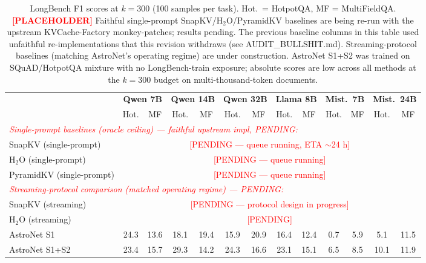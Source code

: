 \begin{table}[t]
\caption{LongBench F1 scores at $k{=}300$ (100 samples per task). Hot.\ = HotpotQA, MF = MultiFieldQA. \textcolor{red}{\textbf{[PLACEHOLDER]}} Faithful single-prompt SnapKV/H$_2$O/PyramidKV baselines are being re-run with the upstream KVCache-Factory monkey-patches; results pending. The previous baseline columns in this table used unfaithful re-implementations that this revision withdraws (see AUDIT\_BULLSHIT.md). Streaming-protocol baselines (matching AstroNet's operating regime) are under construction. AstroNet S1+S2 was trained on SQuAD/HotpotQA mixture with no LongBench-train exposure; absolute scores are low across all methods at the $k{=}300$ budget on multi-thousand-token documents.}
\label{tab:longbench}
\centering
\small
\setlength{\tabcolsep}{2.5pt}
\begin{tabular}{l cc cc cc cc cc cc}
\toprule
& \multicolumn{2}{c}{\textbf{Qwen 7B}} & \multicolumn{2}{c}{\textbf{Qwen 14B}} & \multicolumn{2}{c}{\textbf{Qwen 32B}} & \multicolumn{2}{c}{\textbf{Llama 8B}} & \multicolumn{2}{c}{\textbf{Mist.\ 7B}} & \multicolumn{2}{c}{\textbf{Mist.\ 24B}} \\
\cmidrule(lr){2-3} \cmidrule(lr){4-5} \cmidrule(lr){6-7} \cmidrule(lr){8-9} \cmidrule(lr){10-11} \cmidrule(lr){12-13}
& Hot. & MF & Hot. & MF & Hot. & MF & Hot. & MF & Hot. & MF & Hot. & MF \\
\midrule
\multicolumn{13}{l}{\textcolor{red}{\textit{Single-prompt baselines (oracle ceiling) — faithful upstream impl, PENDING:}}} \\
SnapKV (single-prompt)    & \multicolumn{12}{c}{\textcolor{red}{[PENDING — queue running, ETA $\sim$24 h]}} \\
H${}_2$O (single-prompt)  & \multicolumn{12}{c}{\textcolor{red}{[PENDING — queue running]}} \\
PyramidKV (single-prompt) & \multicolumn{12}{c}{\textcolor{red}{[PENDING — queue running]}} \\
\midrule
\multicolumn{13}{l}{\textcolor{red}{\textit{Streaming-protocol comparison (matched operating regime) — PENDING:}}} \\
SnapKV (streaming)        & \multicolumn{12}{c}{\textcolor{red}{[PENDING — protocol design in progress]}} \\
H${}_2$O (streaming)      & \multicolumn{12}{c}{\textcolor{red}{[PENDING]}} \\
\midrule
AstroNet S1     & 24.3 & 13.6 & 18.1 & 19.4 & 15.9 & 20.9 & 16.4 & 12.4 &  0.7 &  5.9 &  5.1 & 11.5 \\
AstroNet S1+S2  & 23.4 & 15.7 & 29.3 & 14.2 & 24.3 & 16.6 & 23.1 & 15.1 &  6.5 &  8.5 & 10.1 & 11.9 \\
\bottomrule
\end{tabular}
\end{table}

